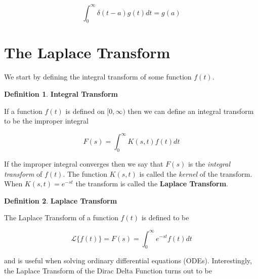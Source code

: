 \documentclass{article}
\theoremstyle{definition}
\newtheorem{definition}{Definition}[section]
\begin{document}
\bigskip
\begin{equation*}
  \int_{0}^{\infty} \delta (t-a) g(t) dt = g(a)
\end{equation*}

\bigskip
\section{The Laplace Transform}
We start by defining the integral transform of some function $f(t)$.

\bigskip
\begin{definition} 
{\bf Integral Transform}
\end{definition}

\noindent
If a function $f(t)$ is defined on $[0,\infty)$ then we can define an integral transform to be the improper integral


\begin{equation*}
F(s) = \int_0^\infty K(s,t) f(t) dt
\end{equation*}

\bigskip
\noindent
If the improper integral converges then we say that $F(s)$ is the \emph{integral transform} of $f(t)$. The function $K(s,t)$ is called the \emph{kernel}
of the transform. When $K(s,t) = e^{-st}$ the transform is called the {\bf Laplace Transform}.

\bigskip
\begin{definition} 
{\bf Laplace Transform}
\label{def:laplace_transform}
\end{definition}

\bigskip
\noindent
The Laplace Transform of a function $f(t)$ is defined to be


\bigskip
\begin{equation}
\mathcal{L}\{f(t)\} = F(s) = \int_0^\infty e^{-st} f(t) dt
\label{eqn:laplace_transform}
\end{equation}

\bigskip
\noindent
and is useful when solving ordinary differential equations (ODEs). Interestingly, the Laplace Transform of the Dirac Delta Function turns out to be
\end{document}
